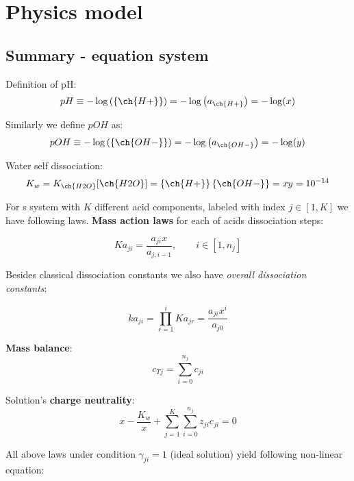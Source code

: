 \section{Physics model}

\subsection{Summary - equation system}

Definition of pH:
\begin{equation} \label{eq:pHdef1}
    pH \equiv -\log\left(\{\ch{H+}\}\right) = -\log\left(a_{\ch{H+}}\right) = -\log(x)
\end{equation}

Similarly we define $pOH$ as:
\begin{equation} \label{eq:pHdef1}
    pOH \equiv -\log\left(\{\ch{OH-}\}\right) = -\log\left(a_{\ch{OH-}}\right) = -\log(y)
\end{equation}

Water self dissociation:
\begin{equation}
    K_w = K_{\ch{H2O}}[\ch{H2O}] = \left\{\ch{H+}\right\} \left\{\ch{OH-}\right\} = x y = 10 ^ {-14}
\end{equation}

For s system with $K$ different acid components, labeled with index $j \in [1, K]$ we have following laws.
\textbf{Mass action laws} for each of acids dissociation steps:

\begin{equation}
    Ka_{ji} = \frac{a_{ji}x}{a_{j,i-1}},\qquad i \in [1, n_j]
\end{equation}

Besides classical dissociation constants we also have \emph{overall dissociation constants}:

\begin{equation}
    ka_{ji} = \prod_{r=1}^{i} Ka_{jr} = \frac{a_{ji}x^i}{a_{j0}}
\end{equation}

\textbf{Mass balance}:
\begin{equation}
    c_{Tj} = \sum_{i=0}^{n_j} c_{ji}
\end{equation}

Solution's \textbf{charge neutrality}:
\begin{equation}
    x - \frac{K_w}{x} + \sum_{j=1}^{K} \sum_{i=0}^{n_j} z_{ji} c_{ji} = 0
\end{equation}


All above laws under condition $\gamma_{ji} = 1$ (ideal solution) yield following non-linear equation:

